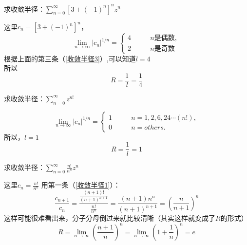 \documentclass[cn,hazy,blue,14pt,normal]{elegantnote}
\numberwithin{equation}{section}
\begin{document}
\begin{example}
	求收敛半径：$\sum_{n=0}^{\infty} [3+(-1)^n]^n z^n $
\end{example}

这里$c_n = [3+(-1)^n]^n$，
$$
\lim\limits_{n \rightarrow \infty} |c_n|^{1/n} = 
\left\{
	\begin{aligned}
		4& \qquad n \text{是偶数}, \\
		2& \qquad n \text{是奇数}
	\end{aligned}
\right.
$$
根据上面的第三条（\ref{收敛半径3}）,可以知道$l=4$\\所以$$R=\frac 1l = \frac 14$$

\begin{example}
	求收敛半径：$\sum_{n=0}^{\infty} z^{n!}$
\end{example}
$$
\lim\limits_{n \rightarrow \infty} |c_n|^{1/n} = 
\left\{
	\begin{aligned}
		1& \qquad n = 1,2,6,24\cdots (n!), \\
		0& \qquad n = others.
	\end{aligned}
\right.
$$
所以，$l = 1$
$$R=\frac 1l = 1$$

\begin{example}
	求收敛半径：$\sum_{n=0}^{\infty} \frac{n!}{n^n}z^{n}$
\end{example}
这里$c_n = \frac{n!}{n^n}$ 用第一条（\ref{收敛半径1}）：
$$ \frac{c_{n+1}}{c_n} = \frac{\frac{(n+1)!}{(n+1)^{n+1}}}{\frac{n!}{n^n}} 
= \frac{(n+1)n^n}{(n+1)^{n+1}} = \left(\frac{n}{n+1}\right)^n$$
这样可能很难看出来，分子分母倒过来就比较清晰（其实这样就变成了$R$的形式）
$$ R = \lim_{n \to \infty} \left(\frac{n+1}{n}\right)^n 
= \lim_{n \to \infty} \left(1 + \frac{1}{n}\right)^n = e $$
\end{document}

